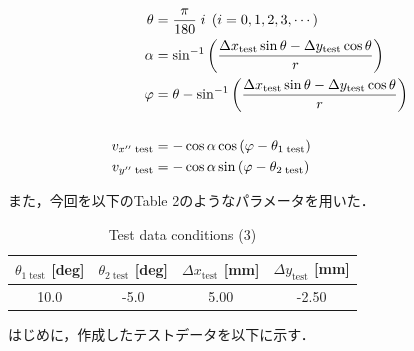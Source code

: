 \documentclass[twocolumn,a4j]{jsarticle}
\begin{document}
\begin{align*}
    \theta                  & = \frac{\pi}{180} \; i \;\left(i = 0, 1, 2, 3, \cdots\right)                                                       \\
    \alpha                  & = \sin^{-1} \left( \frac{\Delta x_\mathrm{test} \sin \theta - \Delta y_\mathrm{test} \cos \theta}{r} \right)       \\
    \varphi                 & = \theta - \sin^{-1}\left(\frac{\Delta x_\mathrm{test} \sin \theta - \Delta y_\mathrm{test} \cos \theta}{r}\right) \\
    \notag                                                                                                                                       \\
    v_{x'' \;\mathrm{test}} & = - \cos \alpha \cos \left(\varphi - \theta_{1\; \mathrm{test}} \right)                                            \\
    v_{y'' \;\mathrm{test}} & = - \cos \alpha \sin \left(\varphi - \theta_{2\; \mathrm{test}}\right)
\end{align*}

また，今回を以下のTable 2のようなパラメータを用いた．

\begin{table}[htbp]
    \begin{center}
        \caption{Test data conditions (3)}
        \begin{tabular}{|p{20mm}|p{20mm}|p{20mm}|p{20mm}|}
            \hline
            \multicolumn{1}{|c|}{$\theta_{1\;\mathrm{test}}$ [deg]} & \multicolumn{1}{|c|}{$\theta_{2\;\mathrm{test}}$ [deg]} & \multicolumn{1}{|c|}{$\Delta x_\mathrm{test}$ [mm]} & \multicolumn{1}{|c|}{$\Delta y_\mathrm{test}$ [mm]} \\ \hline
            \multicolumn{1}{|c|}{10.0}                              & \multicolumn{1}{|c|}{-5.0}                              & \multicolumn{1}{|c|}{5.00}                          & \multicolumn{1}{|c|}{-2.50}                         \\ \hline
        \end{tabular}
    \end{center}
\end{table}

はじめに，作成したテストデータを以下に示す．
\end{document}
